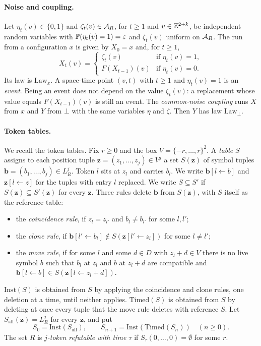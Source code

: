 \paragraph{Noise and coupling.}
Let $\eta_t(v)\in\{0,1\}$ and $\zeta_t(v)\in\mathcal{A}_R$, for $t\ge1$ and $v\in\mathbb{Z}^{2+k}$, be independent random variables with $\mathbb{P}(\eta_t(v)=1)=\varepsilon$ and $\zeta_t(v)$ uniform on $\mathcal{A}_R$. The run from a configuration $x$ is given by $X_0=x$ and, for $t\ge1$,
\begin{equation}\label{fgt:eq-run}
X_t(v)=\begin{cases}\zeta_t(v)&\text{if }\eta_t(v)=1,\\ F(X_{t-1})(v)&\text{if }\eta_t(v)=0.\end{cases}
\end{equation}
Its law is $\mathrm{Law}_x$. A space-time point $(v,t)$ with $t\ge1$ and $\eta_t(v)=1$ is an \emph{event}. Being an event does not depend on the value $\zeta_t(v)$: a replacement whose value equals $F(X_{t-1})(v)$ is still an event. The \emph{common-noise coupling} runs $X$ from $x$ and $Y$ from $\bot$ with the same variables $\eta$ and $\zeta$. Then $Y$ has law $\mathrm{Law}_\bot$.

\paragraph{Token tables.}
We recall the token tables. Fix $r\ge0$ and the box $V=\{-r,\dots,r\}^2$. A \emph{table} $S$ assigns to each position tuple $\mathbf z=(z_1,\dots,z_j)\in V^j$ a set $S(\mathbf z)$ of symbol tuples $\mathbf b=(b_1,\dots,b_j)\in L_R^j$. Token $l$ sits at $z_l$ and carries $b_l$. We write $\mathbf b[l\leftarrow b]$ and $\mathbf z[l\leftarrow z]$ for the tuples with entry $l$ replaced. We write $S\subseteq S'$ if $S(\mathbf z)\subseteq S'(\mathbf z)$ for every $\mathbf z$. Three rules delete $\mathbf b$ from $S(\mathbf z)$, with $S$ itself as the reference table:
\begin{itemize}
\item the \emph{coincidence rule}, if $z_l=z_{l'}$ and $b_l\ne b_{l'}$ for some $l,l'$;
\item the \emph{clone rule}, if $\mathbf b[l'\leftarrow b_l]\notin S(\mathbf z[l'\leftarrow z_l])$ for some $l\ne l'$;
\item the \emph{move rule}, if for some $l$ and some $d\in D$ with $z_l+d\in V$ there is no live symbol $b$ such that $b_l$ at $z_l$ and $b$ at $z_l+d$ are compatible and $\mathbf b[l\leftarrow b]\in S(\mathbf z[l\leftarrow z_l+d])$.
\end{itemize}
$\mathrm{Inst}(S)$ is obtained from $S$ by applying the coincidence and clone rules, one deletion at a time, until neither applies. $\mathrm{Timed}(S)$ is obtained from $S$ by deleting at once every tuple that the move rule deletes with reference $S$. Let $S_{\mathrm{all}}(\mathbf z)=L_R^j$ for every $\mathbf z$, and put
\[
S_0=\mathrm{Inst}(S_{\mathrm{all}}),\qquad S_{n+1}=\mathrm{Inst}(\mathrm{Timed}(S_n))\quad(n\ge0).
\]
The set $R$ is \emph{$j$-token refutable with time $\tau$} if $S_\tau(0,\dots,0)=\emptyset$ for some $r$.

